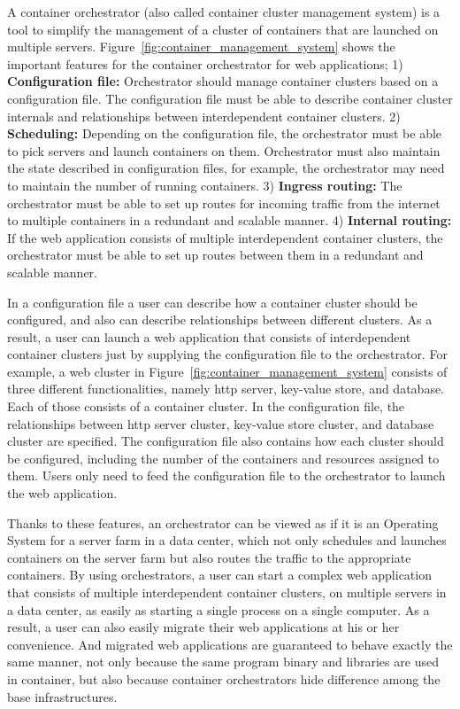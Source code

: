 A container orchestrator (also called container cluster management system) is a tool to simplify the management of a cluster of containers that are launched on multiple servers.
%
%
Figure~\ref{fig:container_management_system} shows the important features for the container orchestrator for web applications;
1) {\bf Configuration file:} Orchestrator should manage container clusters based on a configuration file. 
The configuration file must be able to describe container cluster internals and relationships between interdependent container clusters.
2) {\bf Scheduling:} Depending on the configuration file, the orchestrator must be able to pick servers and launch containers on them.
Orchestrator must also maintain the state described in configuration files, for example, the orchestrator may need to maintain the number of running containers.
3) {\bf Ingress routing:} The orchestrator must be able to set up routes for incoming traffic from the internet to multiple containers in a redundant and scalable manner.
4) {\bf Internal routing:} If the web application consists of multiple interdependent container clusters, the orchestrator must be able to set up routes between them in a redundant and scalable manner.

In a configuration file a user can describe how a container cluster should be configured, and also can describe relationships between different clusters.
As a result, a user can launch a web application that consists of interdependent container clusters just by supplying the configuration file to the orchestrator.
For example, a web cluster in Figure~\ref{fig:container_management_system} consists of three different functionalities, namely http server, key-value store, and database.
Each of those consists of a container cluster.
In the configuration file, the relationships between http server cluster, key-value store cluster, and database cluster are specified.
The configuration file also contains how each cluster should be configured, including the number of the containers and resources assigned to them.
Users only need to feed the configuration file to the orchestrator to launch the web application.

Thanks to these features, an orchestrator can be viewed as if it is an Operating System for a server farm in a data center, which not only schedules and launches containers on the server farm but also routes the traffic to the appropriate containers.
By using orchestrators, a user can start a complex web application that consists of multiple interdependent container clusters, on multiple servers in a data center, as easily as starting a single process on a single computer.
As a result, a user can also easily migrate their web applications at his or her convenience.
And migrated web applications are guaranteed to behave exactly the same manner, not only because the same program binary and libraries are used in container, but also because container orchestrators hide difference among the base infrastructures.


